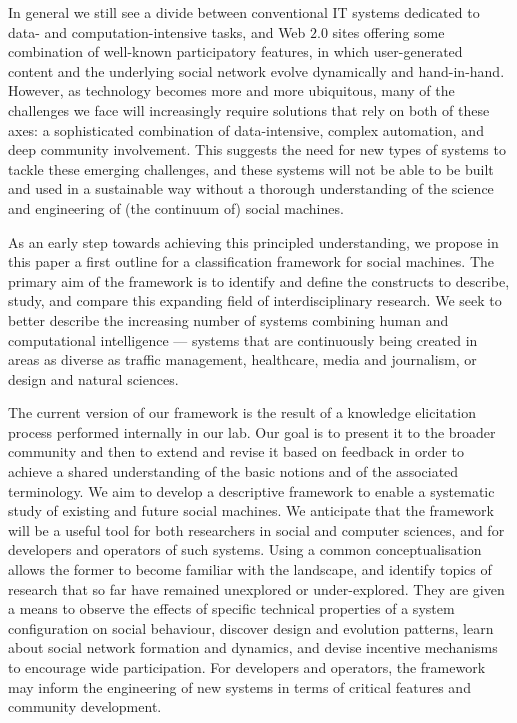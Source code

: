 \documentclass{sig-alternate}
\begin{document}
In general we still see a divide between conventional IT systems dedicated to data- and computation-intensive tasks, and Web $2.0$ sites offering some combination of well-known participatory features, in which user-generated content and the underlying social network evolve dynamically and hand-in-hand. However, as technology becomes more and more ubiquitous, many of the challenges we face will increasingly require solutions that rely on both of these axes: a sophisticated combination of data-intensive, complex automation, and deep community involvement. This suggests the need for new types of systems to tackle these emerging challenges, and these systems will not be able to be built and used in a sustainable way without a thorough understanding of the science and engineering of (the continuum of) social machines.

As an early step towards achieving this principled understanding, we propose in this paper a first outline for a classification framework for social machines. The primary aim of the framework is to identify and define the constructs to describe, study, and compare this expanding field of interdisciplinary research. We seek to better describe the increasing number of systems combining human and computational intelligence --- systems that are continuously being created in areas as diverse as traffic management, healthcare, media and journalism, or design and natural sciences.

The current version of our framework is the result of a knowledge elicitation process performed internally in our lab. Our goal is to present it to the broader community and then to extend and revise it based on feedback in order to achieve a shared understanding of the basic notions and of the associated terminology. We aim to develop a descriptive framework to enable a systematic study of existing and future social machines. We anticipate that the framework will be a useful tool for both researchers in social and computer sciences, and for developers and operators of such systems. Using a common conceptualisation allows the former to become familiar with the landscape, and identify topics of research that so far have remained unexplored or under-explored. They are given a means to observe the effects of specific technical properties of a system configuration on social behaviour, discover design and evolution patterns, learn about social network formation and dynamics, and devise incentive mechanisms to encourage wide participation. For developers and operators, the framework may inform the engineering of new systems in terms of critical features and community development.
\end{document}
